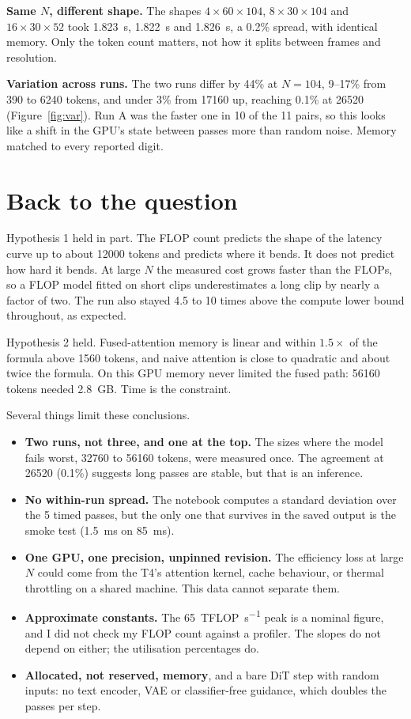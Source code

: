 \documentclass[11pt]{article}
\begin{document}
\textbf{Same $N$, different shape.} The shapes $4\times60\times104$, $8\times30\times104$ and $16\times30\times52$ took \SI{1.823}{s}, \SI{1.822}{s} and \SI{1.826}{s}, a 0.2\% spread, with identical memory. Only the token count matters, not how it splits between frames and resolution.

\textbf{Variation across runs.} The two runs differ by 44\% at $N = 104$, 9--17\% from 390 to \num{6240} tokens, and under 3\% from \num{17160} up, reaching 0.1\% at \num{26520} (Figure~\ref{fig:var}). Run A was the faster one in 10 of the 11 pairs, so this looks like a shift in the GPU's state between passes more than random noise. Memory matched to every reported digit.

\section{Back to the question}

Hypothesis 1 held in part. The FLOP count predicts the shape of the latency curve up to about \num{12000} tokens and predicts where it bends. It does not predict how hard it bends. At large $N$ the measured cost grows faster than the FLOPs, so a FLOP model fitted on short clips underestimates a long clip by nearly a factor of two. The run also stayed 4.5 to 10 times above the compute lower bound throughout, as expected.

Hypothesis 2 held. Fused-attention memory is linear and within $1.5\times$ of the formula above \num{1560} tokens, and naive attention is close to quadratic and about twice the formula. On this GPU memory never limited the fused path: \num{56160} tokens needed \SI{2.8}{GB}. Time is the constraint.

Several things limit these conclusions.
\begin{itemize}
\item \textbf{Two runs, not three, and one at the top.} The sizes where the model fails worst, \num{32760} to \num{56160} tokens, were measured once. The agreement at \num{26520} (0.1\%) suggests long passes are stable, but that is an inference.
\item \textbf{No within-run spread.} The notebook computes a standard deviation over the 5 timed passes, but the only one that survives in the saved output is the smoke test (\SI{1.5}{ms} on \SI{85}{ms}).
\item \textbf{One GPU, one precision, unpinned revision.} The efficiency loss at large $N$ could come from the T4's attention kernel, cache behaviour, or thermal throttling on a shared machine. This data cannot separate them.
\item \textbf{Approximate constants.} The \SI{65}{TFLOP\per\second} peak is a nominal figure, and I did not check my FLOP count against a profiler. The slopes do not depend on either; the utilisation percentages do.
\item \textbf{Allocated, not reserved, memory}, and a bare DiT step with random inputs: no text encoder, VAE or classifier-free guidance, which doubles the passes per step.
\end{itemize}
\end{document}
